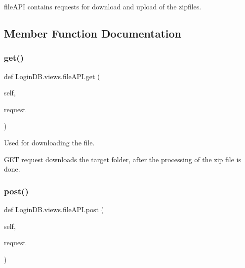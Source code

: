 \begin{DoxyVerb}fileAPI contains requests for download and upload of the zipfiles.
\end{DoxyVerb}
 

\subsection{Member Function Documentation}
\mbox{\label{class_login_d_b_1_1views_1_1file_a_p_i_a103df06e20d613c155c8f4ad0cb59b7c}} 
\subsubsection{\texorpdfstring{get()}{get()}}
{\footnotesize\ttfamily def Login\+D\+B.\+views.\+file\+A\+P\+I.\+get (\begin{DoxyParamCaption}\item[{}]{self,  }\item[{}]{request }\end{DoxyParamCaption})}



Used for downloading the file. 

\begin{DoxyVerb}GET request downloads the target folder, after the processing of the zip file is done.
\end{DoxyVerb}
 \mbox{\label{class_login_d_b_1_1views_1_1file_a_p_i_a6e88d18d20b5d327a78a94fcda9c4efa}} 
\subsubsection{\texorpdfstring{post()}{post()}}
{\footnotesize\ttfamily def Login\+D\+B.\+views.\+file\+A\+P\+I.\+post (\begin{DoxyParamCaption}\item[{}]{self,  }\item[{}]{request }\end{DoxyParamCaption})}



